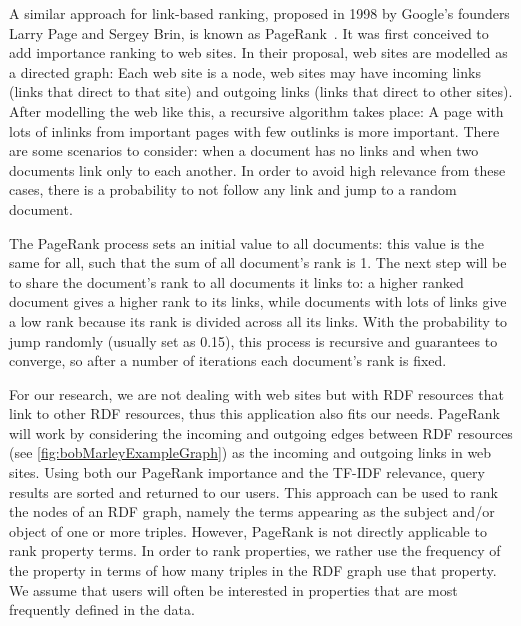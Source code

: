 A similar approach for link-based ranking, proposed in 1998 by Google's founders Larry Page and Sergey Brin, is known as PageRank~\cite{Page1998}. It was first conceived to add importance ranking to web sites. In their proposal, web sites are modelled as a directed graph: Each web site is a node, web sites may have incoming links (links that direct to that site) and outgoing links (links that direct to other sites). After modelling the web like this, a recursive algorithm takes place: A page with lots of inlinks from important pages with few outlinks is more important. There are some scenarios to consider: when a document has no links and when two documents link only to each another. In order to avoid high relevance from these cases, there is a probability to not follow any link and jump to a random document.

The PageRank process sets an initial value to all documents: this value is the same for all, such that the sum of all document’s rank is 1. The next step will be to share the document's rank to all documents it links to: a higher ranked document gives a higher rank to its links, while documents with lots of links give a low rank because its rank is divided across all its links. With the probability to jump randomly (usually set as 0.15), this process is recursive and guarantees to converge, so after a number of iterations each document’s rank is fixed.

For our research, we are not dealing with web sites but with RDF resources that link to other RDF resources, thus this application also fits our needs. PageRank will work by considering the incoming and outgoing edges between RDF resources (see \autoref{fig:bobMarleyExampleGraph}) as the incoming and outgoing links in web sites. Using both our PageRank importance and the TF-IDF relevance, query results are sorted and returned to our users. This approach can be used to rank the nodes of an RDF graph, namely the terms appearing as the subject and/or object of one or more triples. However, PageRank is not directly applicable to rank property terms. In order to rank properties, we rather use the frequency of the property in terms of how many triples in the RDF graph use that property. We assume that users will often be interested in properties that are most frequently defined in the data.


